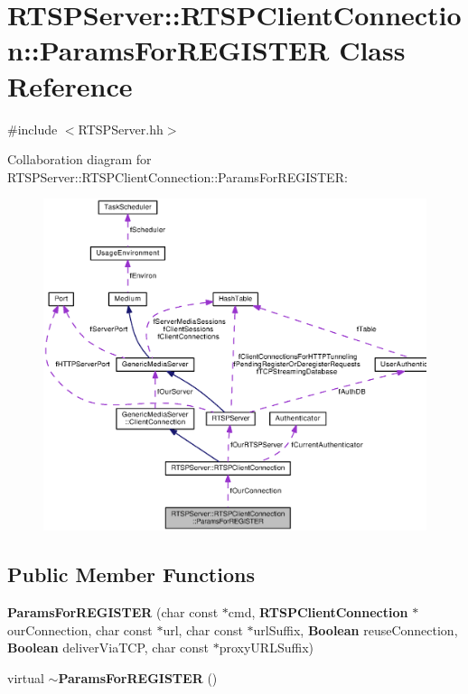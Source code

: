 \section{R\+T\+S\+P\+Server\+:\+:R\+T\+S\+P\+Client\+Connection\+:\+:Params\+For\+R\+E\+G\+I\+S\+T\+E\+R Class Reference}
\label{classRTSPServer_1_1RTSPClientConnection_1_1ParamsForREGISTER}


{\ttfamily \#include $<$R\+T\+S\+P\+Server.\+hh$>$}



Collaboration diagram for R\+T\+S\+P\+Server\+:\+:R\+T\+S\+P\+Client\+Connection\+:\+:Params\+For\+R\+E\+G\+I\+S\+T\+E\+R\+:
\nopagebreak
\begin{figure}[H]
\begin{center}
\leavevmode
\includegraphics[width=350pt]{classRTSPServer_1_1RTSPClientConnection_1_1ParamsForREGISTER__coll__graph}
\end{center}
\end{figure}
\subsection*{Public Member Functions}
\begin{DoxyCompactItemize}
\item 
{\bf Params\+For\+R\+E\+G\+I\+S\+T\+E\+R} (char const $\ast$cmd, {\bf R\+T\+S\+P\+Client\+Connection} $\ast$our\+Connection, char const $\ast$url, char const $\ast$url\+Suffix, {\bf Boolean} reuse\+Connection, {\bf Boolean} deliver\+Via\+T\+C\+P, char const $\ast$proxy\+U\+R\+L\+Suffix)
\item 
virtual {\bf $\sim$\+Params\+For\+R\+E\+G\+I\+S\+T\+E\+R} ()
\end{DoxyCompactItemize}

